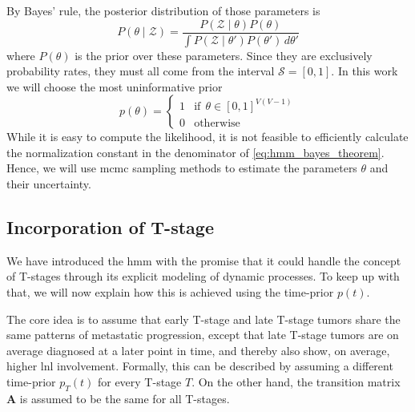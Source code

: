 \documentclass[../ms.tex]{subfiles}
\begin{document}
By Bayes' rule, the posterior distribution of those parameters is 
%
\begin{equation} \label{eq:hmm_bayes_theorem}
    P \left( \theta \mid \boldsymbol{\mathcal{Z}} \right) = \frac{P \left( \boldsymbol{\mathcal{Z}} \mid \theta \right) P\left( \theta \right)}{\int{P \left( \boldsymbol{\mathcal{Z}} \mid \theta' \right) P \left( \theta' \right) \,d\theta'}}
\end{equation}
%
where $P(\theta)$ is the prior over these parameters. Since they are exclusively probability rates, they must all come from the interval $\mathcal{S} = [0,1]$. In this work we will choose the most uninformative prior
%
\begin{equation}
    p(\theta) = 
    \begin{cases}
        1 & \text{if} \ \ \theta \in \left[ 0,1 \right]^{V(V-1)} \\
        0 & \text{otherwise}
    \end{cases}
\end{equation}
%
While it is easy to compute the likelihood, it is not feasible to efficiently calculate the normalization constant in the denominator of \cref{eq:hmm_bayes_theorem}. Hence, we will use \gls{mcmc} sampling methods to estimate the parameters $\theta$ and their uncertainty.

\subsection{Incorporation of T-stage}
\label{subsec:hmm_tstage}

We have introduced the \gls{hmm} with the promise that it could handle the concept of T-stages through its explicit modeling of dynamic processes. To keep up with that, we will now explain how this is achieved using the time-prior $p(t)$.

The core idea is to assume that early T-stage and late T-stage tumors share the same patterns of metastatic progression, except that late T-stage tumors are on average diagnosed at a later point in time, and thereby also show, on average, higher \gls{lnl} involvement. Formally, this can be described by assuming a different time-prior $p_T (t)$ for every T-stage $T$.  On the other hand, the transition matrix $\mathbf{A}$ is assumed to be the same for all T-stages.
\end{document}
